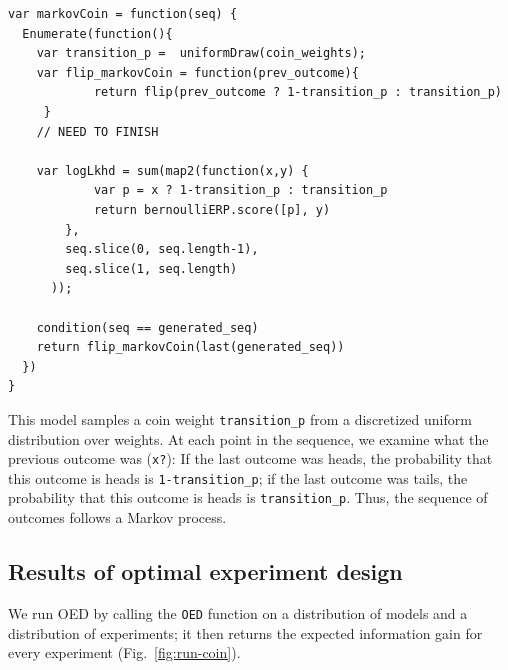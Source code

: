 \documentclass{article}
\begin{document}
%

\begin{lstlisting}[caption=Markov coin model]
var markovCoin = function(seq) {
  Enumerate(function(){
    var transition_p =  uniformDraw(coin_weights);
    var flip_markovCoin = function(prev_outcome){
    		return flip(prev_outcome ? 1-transition_p : transition_p)
	 }
	// NEED TO FINISH

    var logLkhd = sum(map2(function(x,y) {
    		var p = x ? 1-transition_p : transition_p
     	 	return bernoulliERP.score([p], y)
    	},
    	seq.slice(0, seq.length-1),
    	seq.slice(1, seq.length)
	  ));

    condition(seq == generated_seq)
    return flip_markovCoin(last(generated_seq))
  })
}
\end{lstlisting}
%
This model samples a coin weight \lstinline{transition_p} from a discretized uniform distribution over weights.
At each point in the sequence, we examine what the previous outcome was (\lstinline{x?}): If the last outcome was heads, the probability that this outcome is heads is \lstinline{1-transition_p}; if the last outcome was tails, the probability that this outcome is heads is \lstinline{transition_p}. Thus, the sequence of outcomes follows a Markov process.

\subsection{Results of optimal experiment design}

We run OED by calling the \lstinline{OED} function on a distribution of models and a distribution of experiments; it then returns the expected information gain for every experiment (Fig.~\ref{fig:run-coin}).
\end{document}
